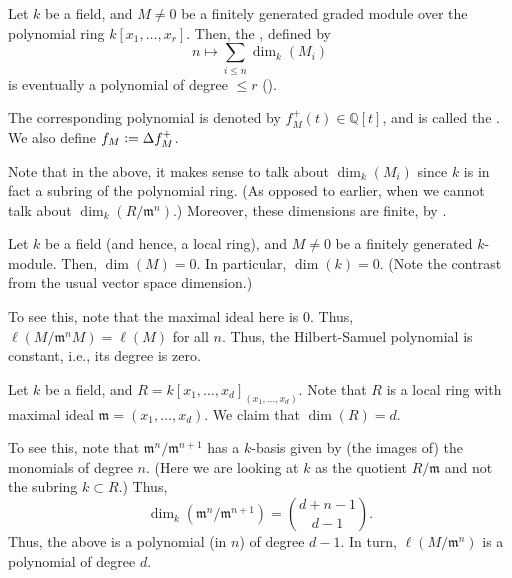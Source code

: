 \documentclass[12pt]{article}
\begin{document}
\begin{defn} \label{defn:hilbert-function}
	Let $k$ be a field, and $M \neq 0$ be a finitely generated graded module over the polynomial ring $k[x_{1}, \ldots, x_{r}]$. Then, the , defined by
	\begin{equation*} 
		n \mapsto \sum_{i \le n} \dim_{k}(M_{i})
	\end{equation*}
	is eventually a polynomial of degree $\le r$ ().

	 The corresponding polynomial is denoted by $f_{M}^{+}(t) \in \mathbb{Q}[t]$, and is called the . We also define $f_{M} \vcentcolon= \Delta f_{M}^{+}$.
\end{defn}
Note that in the above, it makes sense to talk about $\dim_{k}(M_{i})$ since $k$ is in fact a subring of the polynomial ring. (As opposed to earlier, when we cannot talk about $\dim_{k}(R/\mathfrak{m}^{n})$.) Moreover, these dimensions are finite, by .

\begin{ex} \label{ex:dimension-field}
	Let $k$ be a field (and hence, a local ring), and $M \neq 0$ be a finitely generated $k$-module. Then, $\dim(M) = 0$. In particular, $\dim(k) = 0$. (Note the contrast from the usual vector space dimension.)

	To see this, note that the maximal ideal here is $0$. Thus, $\ell(M/\mathfrak{m}^{n} M) = \ell(M)$ for all $n$. Thus, the Hilbert-Samuel polynomial is constant, i.e., its degree is zero.
\end{ex}

\begin{ex} \label{ex:dimension-polynomial-field}
	Let $k$ be a field, and $R = k[x_{1}, \ldots, x_{d}]_{(x_{1}, \ldots, x_{d})}$. \newline
	Note that $R$ is a local ring with maximal ideal $\mathfrak{m} = (x_{1}, \ldots, x_{d})$. We claim that $\dim(R) = d$.

	To see this, note that $\mathfrak{m}^{n}/\mathfrak{m}^{n + 1}$ has a $k$-basis given by (the images of) the monomials of degree $n$. (Here we are looking at $k$ as the quotient $R/\mathfrak{m}$ and not the subring $k \subset R$.) \newline
	Thus,
	\begin{equation*} 
		\dim_{k}(\mathfrak{m}^{n}/\mathfrak{m}^{n + 1}) = \binom{d + n - 1}{d - 1}.
	\end{equation*}
	Thus, the above is a polynomial (in $n$) of degree $d - 1$. In turn, $\ell(M/\mathfrak{m}^{n})$ is a polynomial of degree $d$.
\end{ex}
\end{document}
